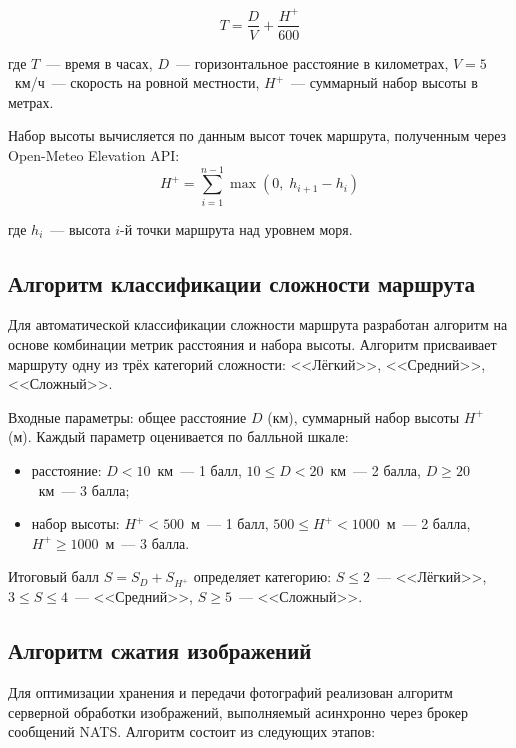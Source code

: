\begin{equation}
  T = \frac{D}{V} + \frac{H^{+}}{600}
\end{equation}

где $T$~--- время в часах, $D$~--- горизонтальное расстояние в километрах, $V = 5$~км/ч~--- скорость на ровной местности, $H^{+}$~--- суммарный набор высоты в метрах.

Набор высоты вычисляется по данным высот точек маршрута, полученным через Open-Meteo Elevation API:
\begin{equation}
  H^{+} = \sum_{i=1}^{n-1} \max(0,\; h_{i+1} - h_i)
\end{equation}

где $h_i$~--- высота $i$-й точки маршрута над уровнем моря.

\subsection{Алгоритм классификации сложности маршрута}

Для автоматической классификации сложности маршрута разработан алгоритм на основе комбинации метрик расстояния и набора высоты. Алгоритм присваивает маршруту одну из трёх категорий сложности: <<Лёгкий>>, <<Средний>>, <<Сложный>>.

Входные параметры: общее расстояние $D$ (км), суммарный набор высоты $H^{+}$ (м). Каждый параметр оценивается по балльной шкале:

\begin{itemize}
  \item расстояние: $D < 10$~км~--- 1 балл, $10 \leq D < 20$~км~--- 2 балла, $D \geq 20$~км~--- 3 балла;
  \item набор высоты: $H^{+} < 500$~м~--- 1 балл, $500 \leq H^{+} < 1000$~м~--- 2 балла, $H^{+} \geq 1000$~м~--- 3 балла.
\end{itemize}

Итоговый балл $S = S_D + S_{H^{+}}$ определяет категорию: $S \leq 2$~--- <<Лёгкий>>, $3 \leq S \leq 4$~--- <<Средний>>, $S \geq 5$~--- <<Сложный>>.

\subsection{Алгоритм сжатия изображений}

Для оптимизации хранения и передачи фотографий реализован алгоритм серверной обработки изображений, выполняемый асинхронно через брокер сообщений NATS. Алгоритм состоит из следующих этапов:

